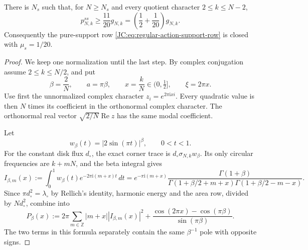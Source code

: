 \begin{proposition}
\label{JC:prop:regular-support-renormalized}
There is $N_s$ such that, for $N\ge N_s$ and every quotient character
$2\le k\le N-2$,
\begin{equation}\label{JC:eq:regular-support-closed-gap}
 \boxed{
 p^{ss}_{N,k}\ge\frac{11}{20}g_{N,k}
 =\left(\frac12+\frac1{20}\right)g_{N,k}.}
\end{equation}
Consequently the pure-support row
\eqref{JC:eq:regular-action-support-row} is closed with
$\mu_s=1/20$.
\end{proposition}

\begin{proof}
We keep one normalization until the last step.  By complex conjugation
assume $2\le k\le N/2$, and put
\[
 \beta=\frac2N,\qquad a=\pi\beta,\qquad
 x=\frac{k}{N}\in(0,\tfrac12],\qquad \xi=2\pi x.
\]
Use first the unnormalized complex character
$z_i=e^{2\pi\mathrm i x i}$.
Every quadratic value is then $N$ times its coefficient in the
orthonormal complex character.  The orthonormal real vector
$\sqrt{2/N}\operatorname{Re}z$ has the same modal coefficient.

Let
\[
 w_\beta(t)=|2\sin(\pi t)|^\beta,\qquad0<t<1.
\]
For the constant disk flux $d_\circ$, the exact corner trace is
$d_\circ\sigma_{N,k}w_\beta$.  Its only circular frequencies are
$k+mN$, and the beta integral gives
\begin{equation}\label{JC:eq:corner-Gamma-coefficient}
 I_{\beta,m}(x):=\int_0^1w_\beta(t)e^{-2\pi\mathrm i(m+x)t}\,dt
 =
 e^{-\pi\mathrm i(m+x)}
 \frac{\Gamma(1+\beta)}
 {\Gamma(1+\beta/2+m+x)\Gamma(1+\beta/2-m-x)}.
\end{equation}
Since $\pi d_\circ^2=\lambda_\circ$ by Rellich's identity, harmonic
energy and the area row, divided by $Nd_\circ^2$, combine into
\begin{equation}\label{JC:eq:corner-joint-finite-N-symbol}
 P_\beta(x):=
 2\pi\sum_{m\in\mathbb Z}|m+x||I_{\beta,m}(x)|^2
 +\frac{\cos(2\pi x)-\cos(\pi\beta)}{\sin(\pi\beta)}.
\end{equation}
The two terms in this formula separately contain the same
$\beta^{-1}$ pole with opposite signs.


\end{proof}
